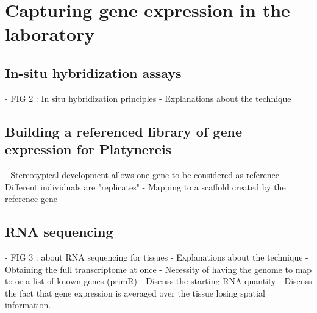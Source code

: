 \section{Capturing gene expression in the laboratory}
     \subsection*{In-situ hybridization assays}
    - FIG 2 : In situ hybridization principles
    - Explanations about the technique 

     \subsection*{Building a referenced library of gene expression for Platynereis}
         - Stereotypical development allows one gene to be considered as reference
    - Different individuals are "replicates"
    - Mapping to a scaffold created by the reference gene

     \subsection*{RNA sequencing}
    - FIG 3 : about RNA sequencing for tissues
    - Explanations about the technique
    - Obtaining the full transcriptome at once
    - Necessity of having the genome to map to or a list of known genes (primR) 
    - Discuss the starting RNA quantity 
    - Discuss the fact that gene expression is averaged over the tissue losing spatial information.





